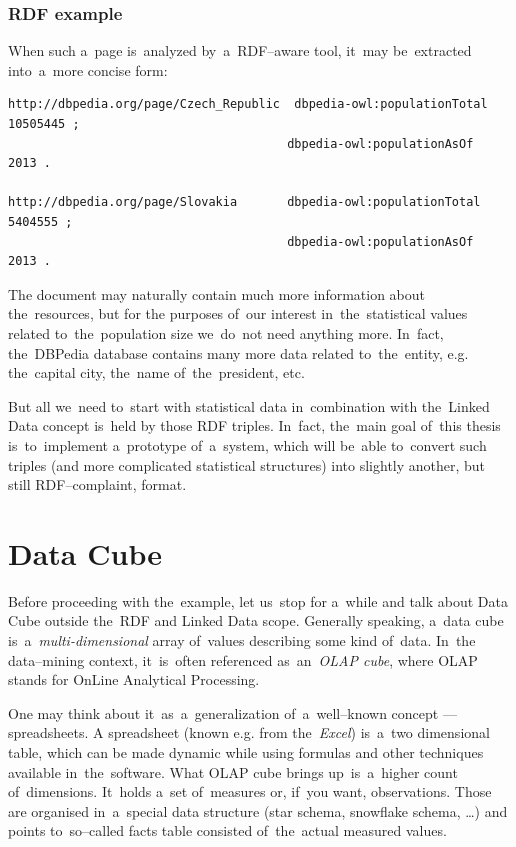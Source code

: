 \subsubsection{RDF example}

When such a~page is~analyzed by~a~RDF--aware tool, it~may be~extracted into~a~more concise form:

\scriptsize\begin{verbatim}
http://dbpedia.org/page/Czech_Republic	dbpedia-owl:populationTotal		10505445 ;
                                       dbpedia-owl:populationAsOf		2013 .

http://dbpedia.org/page/Slovakia       dbpedia-owl:populationTotal		5404555 ;
                                       dbpedia-owl:populationAsOf		2013 .
\end{verbatim}\normalsize

The document may naturally contain much more information about the~resources, but for the
purposes of~our interest in~the~statistical values related to~the~population size we~do~not
need anything more. In~fact, the~DBPedia database contains many more data related to~the~entity,
e.g. the~capital city, the~name of~the~president, etc.

But all we~need to~start with statistical data in~combination with the~Linked Data concept is~held
by those RDF triples. In~fact, the~main goal of~this thesis is~to~implement a~prototype of~a~system, which will be~able to~convert such triples (and more complicated statistical structures) into
slightly another, but still RDF--complaint, format.

\section{Data Cube}
\label{sec:datacube}
Before proceeding with the~example, let us~stop for a~while and talk about Data Cube outside
the~RDF and Linked Data scope. Generally speaking, a~data cube is~a~\emph{multi-dimensional}
 array of~values describing some kind of~data. In~the
data--mining context, it~is~often referenced as~an~\emph{OLAP cube}, where OLAP stands for OnLine
Analytical Processing.

One may think about it~as~a~generalization of~a~well--known concept --- spreadsheets.
A spreadsheet (known e.g. from the~\emph{Excel}) is~a~two dimensional table, which can be
made dynamic while using formulas and other techniques available in~the~software. What
OLAP cube brings up~is~a~higher count of~dimensions. It~holds a~set of~measures or, if~you
want, observations. Those are organised in~a~special data structure (star schema, snowflake
schema, …) and points to~so--called facts table consisted of~the~actual measured values.

